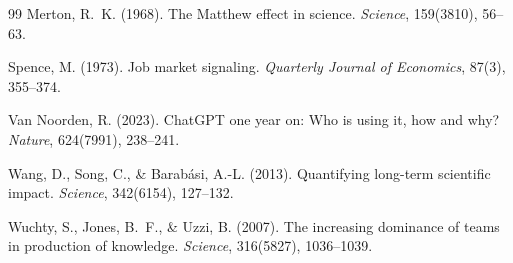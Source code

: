 \documentclass[12pt,a4paper]{article}
\begin{document}
\begin{thebibliography}{99}
Merton, R.~K. (1968).
\newblock The Matthew effect in science.
\newblock \textit{Science}, 159(3810), 56--63.

Spence, M. (1973).
\newblock Job market signaling.
\newblock \textit{Quarterly Journal of Economics}, 87(3), 355--374.

Van Noorden, R. (2023).
\newblock ChatGPT one year on: Who is using it, how and why?
\newblock \textit{Nature}, 624(7991), 238--241.

Wang, D., Song, C., \& Barabási, A.-L. (2013).
\newblock Quantifying long-term scientific impact.
\newblock \textit{Science}, 342(6154), 127--132.

Wuchty, S., Jones, B.~F., \& Uzzi, B. (2007).
\newblock The increasing dominance of teams in production of knowledge.
\newblock \textit{Science}, 316(5827), 1036--1039.

\end{thebibliography}

\newpage
\end{document}
